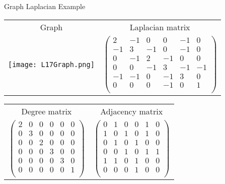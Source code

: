 \documentclass[10pt, table, dvipsnames,xcdraw,handout]{beamer}
\begin{document}
\begin{frame}[fragile]{Graph Laplacian Example}
\begin{table}[]
\small
\begin{tabular}{cc}
Graph&Laplacian matrix
\\
\texttt{[image: L17Graph.png]} 
&
$
\left(\begin{array}{rrrrrr}
   2 & -1 &  0 &  0 & -1 &  0\\
  -1 &  3 & -1 &  0 & -1 &  0\\
   0 & -1 &  2 & -1 &  0 &  0\\
   0 &  0 & -1 &  3 & -1 & -1\\
  -1 & -1 &  0 & -1 &  3 &  0\\
   0 &  0 &  0 & -1 &  0 &  1\\
\end{array}\right)
$
\end{tabular}
\end{table}
\begin{table}[]
\small
\begin{tabular}{cc}
Degree matrix & Adjacency matrix
\\
$
\left(
\begin{array}{rrrrrr}
  2 &  0 &  0 &  0 &  0 &  0\\
  0 &  3 &  0 &  0 &  0 &  0\\
  0 &  0 &  2 &  0 &  0 &  0\\
  0 &  0 &  0 &  3 &  0 &  0\\
  0 &  0 &  0 &  0 &  3 &  0\\
  0 &  0 &  0 &  0 &  0 &  1\\
\end{array}\right)
$
&
$
\left(\begin{array}{rrrrrr}
  0 &  1 &  0 &  0 &  1 &  0\\
  1 &  0 &  1 &  0 &  1 &  0\\
  0 &  1 &  0 &  1 &  0 &  0\\
  0 &  0 &  1 &  0 &  1 &  1\\
  1 &  1 &  0 &  1 &  0 &  0\\
  0 &  0 &  0 &  1 &  0 &  0\\
\end{array}\right)
$
\end{tabular}
\end{table}
\end{frame}
\end{document}
